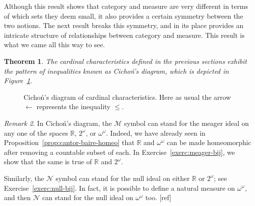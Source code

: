 \documentclass[11pt,oneside]{amsbook}
\newcommand{\RR}{\mathbb R}
\newcommand{\Null}{\mathcal N}
\newcommand{\Meager}{\mathcal M}
\DeclareMathOperator{\add}{\mathsf{add}}
\DeclareMathOperator{\non}{\mathsf{non}}
\DeclareMathOperator{\cov}{\mathsf{cov}}
\DeclareMathOperator{\cof}{\mathsf{cof}}
\theoremstyle{definition}
\theoremstyle{plain}
\newtheorem{thm}{Theorem}[section]
\theoremstyle{definition}
\theoremstyle{remark}
\newtheorem{rem}[thm]{Remark}
\begin{document}
Although this result shows that category and measure are very different in terms of which sets they deem small, it also provides a certain symmetry between the two notions. The next result breaks this symmetry, and in its place provides an intricate structure of relationships between category and measure. This result is what we came all this way to see.

\begin{thm}
  \label{thm:cichon}
  The cardinal characteristics defined in the previous sections exhibit the pattern of inequalities known as \emph{Cicho\'n's diagram}, which is depicted in Figure~\ref{fig:cichon}.
\end{thm}

\begin{figure}[h]
  \caption{Cicho\'n's diagram of cardinal characteristics. Here as usual the arrow $\leftarrow$ represents the inequality $\leq$.\label{fig:cichon}}
\end{figure}

\begin{rem}
  In Cicho\'n's diagram, the $\Meager$ symbol can stand for the meager ideal on any one of the spaces $\RR$, $2^\omega$, or $\omega^\omega$. Indeed, we have already seen in Proposition~\ref{prop:cantor-baire-homeo} that $\RR$ and $\omega^\omega$ can be made homeomorphic after removing a countable subset of each. In Exercise~\ref{exerc:meager-bij}, we show that the same is true of $\RR$ and $2^\omega$.

  Similarly, the $\Null$ symbol can stand for the null ideal on either $\RR$ or $2^\omega$; see Exercise~\ref{exerc:null-bij}. In fact, it is possible to define a natural measure on $\omega^\omega$, and then $\Null$ can stand for the null ideal on $\omega^\omega$ too. [ref] %
\end{rem}
\end{document}
